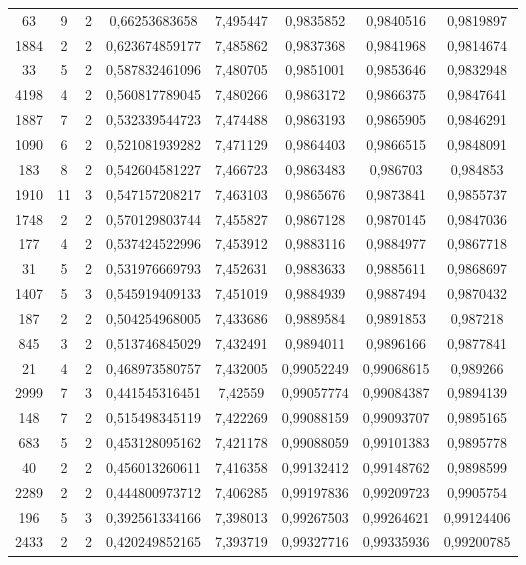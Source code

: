 \begin{longtable}{|c|c|c|c|c|c|c|c|}
63 & 9 & 2 & 0,66253683658 & 7,495447 & 0,9835852 & 0,9840516 & 0,9819897 \\
1884 & 2 & 2 & 0,623674859177 & 7,485862 & 0,9837368 & 0,9841968 & 0,9814674 \\
33 & 5 & 2 & 0,587832461096 & 7,480705 & 0,9851001 & 0,9853646 & 0,9832948 \\
4198 & 4 & 2 & 0,560817789045 & 7,480266 & 0,9863172 & 0,9866375 & 0,9847641 \\
1887 & 7 & 2 & 0,532339544723 & 7,474488 & 0,9863193 & 0,9865905 & 0,9846291 \\
1090 & 6 & 2 & 0,521081939282 & 7,471129 & 0,9864403 & 0,9866515 & 0,9848091 \\
183 & 8 & 2 & 0,542604581227 & 7,466723 & 0,9863483 & 0,986703 & 0,984853 \\
1910 & 11 & 3 & 0,547157208217 & 7,463103 & 0,9865676 & 0,9873841 & 0,9855737 \\
1748 & 2 & 2 & 0,570129803744 & 7,455827 & 0,9867128 & 0,9870145 & 0,9847036 \\
177 & 4 & 2 & 0,537424522996 & 7,453912 & 0,9883116 & 0,9884977 & 0,9867718 \\
31 & 5 & 2 & 0,531976669793 & 7,452631 & 0,9883633 & 0,9885611 & 0,9868697 \\
1407 & 5 & 3 & 0,545919409133 & 7,451019 & 0,9884939 & 0,9887494 & 0,9870432 \\
187 & 2 & 2 & 0,504254968005 & 7,433686 & 0,9889584 & 0,9891853 & 0,987218 \\
845 & 3 & 2 & 0,513746845029 & 7,432491 & 0,9894011 & 0,9896166 & 0,9877841 \\
21 & 4 & 2 & 0,468973580757 & 7,432005 & 0,99052249 & 0,99068615 & 0,989266 \\
2999 & 7 & 3 & 0,441545316451 & 7,42559 & 0,99057774 & 0,99084387 & 0,9894139 \\
148 & 7 & 2 & 0,515498345119 & 7,422269 & 0,99088159 & 0,99093707 & 0,9895165 \\
683 & 5 & 2 & 0,453128095162 & 7,421178 & 0,99088059 & 0,99101383 & 0,9895778 \\
40 & 2 & 2 & 0,456013260611 & 7,416358 & 0,99132412 & 0,99148762 & 0,9898599 \\
2289 & 2 & 2 & 0,444800973712 & 7,406285 & 0,99197836 & 0,99209723 & 0,9905754 \\
196 & 5 & 3 & 0,392561334166 & 7,398013 & 0,99267503 & 0,99264621 & 0,99124406 \\
2433 & 2 & 2 & 0,420249852165 & 7,393719 & 0,99327716 & 0,99335936 & 0,99200785 \\

\end{longtable}
